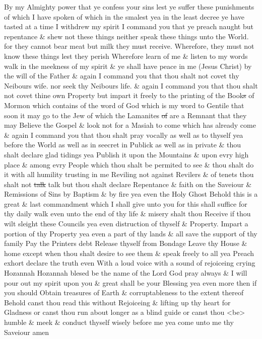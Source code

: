 		By my Almighty power that ye confess your sins lest ye suffer these punishments of which I have spoken of which in the smalest yea in the least decree ye have tasted at a time I withdrew my spirit I command you that ye preach naught but repentance \& shew not these things neither speak these things unto the World. for they cannot bear meat but milk they must receive. Wherefore, they must not know these things lest they perish Wherefore learn of me \& listen to my words walk in the meekness of my spirit \& ye shall have peace in me (Jesus Christ) by the will of the Father \& again I command you that thou shalt not covet thy Neibours wife. nor seek thy Neibours life. \& again I command you that thou shalt not covet thine own Property but impart it freely to the printing of the Book\sout{s} of Mormon which contains of the word of God which is my word to Gentile that soon it may go to the Jew of which the Lamanites \sout{of} are a Remnant that they may Believe the Gospel \& look not for a Masiah to come which has already come \& again I command you that thou shalt pray vocally as well as to thyself yea before the World as well as in seecret in Publick as well as in private \& thou shalt declare glad tidings yea Publish it upon the Mountains \& upon evry high place \& among evry People which thou shalt be permited to see \& thou shalt do it with all humility trusting in me Reviling not against Revilers \& of tenets thou shalt not \sout{talk} talk but thou shalt declare Repentance \& faith on the Saveiour \& Remissions of Sins by Baptism \& by fire yea even the Holy Ghost Behold this is a great \& last commandment which I shall give unto you for this shall suffice for thy daily walk even unto the end of thy life \& misery shalt thou Receive if thou wilt sleight these Councils yea even distruction of thyself \& Property. Impart a portion of thy Property yea even a part of thy lands \& all save the support of thy family Pay the Printers debt Release thyself from Bondage Leave thy House \& home except when thou shalt desire to see them \& speak freely to all yea Preach exhort declare the truth even With a loud voice with a sound of rejoiceing crying Hozannah Hozannah blesed be the name of the Lord God pray always \& I will pour out my spirit upon you \& great shall be your Blessing yea even more then if you should Obtain treasures of Earth \& corruptableness to the extent thereof Behold canst thou read this without Rejoiceing \& lifting up thy heart for Gladness or canst thou run about longer as a blind guide or canst thou <be> humble \& meek \& conduct thyself wisely before me yea come unto me thy Saveiour amen
		
